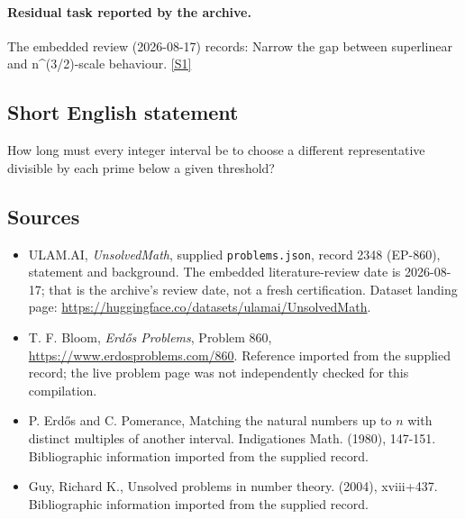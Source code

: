 \documentclass[11pt,a4paper]{article}
\newcommand{\sref}[2]{\hyperlink{source:#1:#2}{[S#2]}}
\begin{document}
\paragraph{Residual task reported by the archive.}

The embedded review (2026-08-17) records: Narrow the gap between superlinear and n\textasciicircum{}(3/2)-scale behaviour. \sref{2348}{1}

\subsection{Short English statement}

How long must every integer interval be to choose a different representative divisible by each prime below a given threshold?

\subsection{Sources}

{\small

\begin{itemize}

\item[\hypertarget{source:2348:1}{S1}] ULAM.AI, \emph{UnsolvedMath}, supplied \texttt{problems.json}, record 2348 (EP-860), statement and background. The embedded literature-review date is 2026-08-17; that is the archive’s review date, not a fresh certification. Dataset landing page: \url{https://huggingface.co/datasets/ulamai/UnsolvedMath}.

\item[\hypertarget{source:2348:2}{S2}] T. F. Bloom, \emph{Erdős Problems}, Problem 860, \url{https://www.erdosproblems.com/860}. Reference imported from the supplied record; the live problem page was not independently checked for this compilation.

\item[\hypertarget{source:2348:3}{S3}] P. Erd\H{o}s and C. Pomerance, Matching the natural numbers up to $n$ with distinct multiples of another interval. Indigationes Math. (1980), 147-151. Bibliographic information imported from the supplied record.

\item[\hypertarget{source:2348:4}{S4}] Guy, Richard K., Unsolved problems in number theory. (2004), xviii+437. Bibliographic information imported from the supplied record.

\end{itemize}

}

\label{end:2348}
\end{document}
